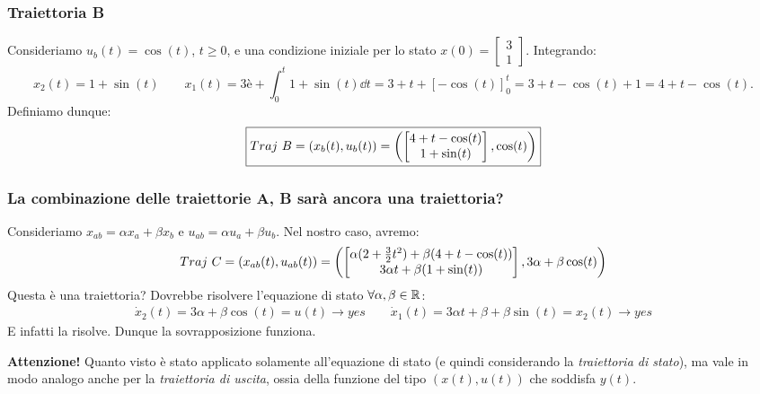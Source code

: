 \documentclass[a4paper]{report}
\begin{document}
\begin{esem}
\subsubsection{Traiettoria B}
Consideriamo $u_b(t) = \cos(t)$, $t \geq 0$, e una condizione iniziale per lo stato $x(0) = \begin{bmatrix}
	3 \\ 1
\end{bmatrix}$. Integrando:
\begin{equation*}
	x_2(t) = 1+\sin(t) \quad \quad x_1(t) =3è+\int_0^t1+\sin(t)\dd{t} = 3
	+t+[-\cos(t)]^t_0 = 3+t-\cos(t) + 1 = 4+t-\cos(t).
\end{equation*}
Definiamo dunque:
\begin{equation*}
	\boxed{Traj \ B = (x_b(t), u_b(t)) = \left( \begin{bmatrix}
		4+t-\cos(t) \\ 1+\sin(t)
	\end{bmatrix}, \cos(t) \right)}
\end{equation*}

\subsubsection{La combinazione delle traiettorie A, B sarà ancora una traiettoria?}
Consideriamo  $x_{ab} = \alpha x_a + \beta x_b$ e $u_{ab} = \alpha u_a + \beta u_b$.  Nel nostro caso, avremo:
\begin{equation*}
	Traj \ C = (x_{ab}(t), u_{ab}(t)) = \left( \begin{bmatrix}
		\alpha(2+\frac{3}{2} t^2) + \beta(4+t-\cos(t)) \\ 3\alpha t + \beta(1+\sin(t))
	\end{bmatrix}, 3\alpha+\beta \cos(t)  \right)
\end{equation*}
Questa è una traiettoria? Dovrebbe risolvere l'equazione di stato $\forall \alpha, \beta \in \mathbb{R}$:
\begin{align*}
	\dot x_2(t) = 3\alpha +\beta \cos (t) = u(t) \rightarrow yes \quad \quad \dot x_1(t) = 3\alpha t +\beta +\beta \sin(t) = x_2(t) \rightarrow yes
\end{align*}
E infatti la risolve. Dunque la sovrapposizione funziona.
\end{esem}
\textbf{Attenzione!} Quanto visto è stato applicato solamente all'equazione di stato (e quindi considerando la \textit{traiettoria di stato}), ma vale in modo analogo anche per la \textit{traiettoria di uscita}, ossia della funzione del tipo $(x(t), u(t))$ che soddisfa $y(t)$.
\end{document}
